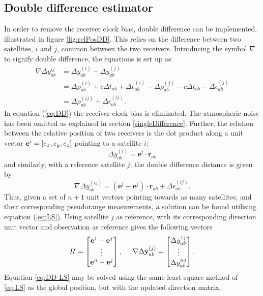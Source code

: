 \subsection{Double difference estimator}\label{ch:DD_estimator}
In order to remove the receiver clock bias, double difference can be implemented, illustrated in figure \ref{fig:relPosDD}. This relies on the difference between two satellites, $i$ and $j$, common between the two receivers. Introducing the symbol $\nabla$ to signify double difference, the equations is set up as
\begin{align}
\nabla \Delta y^{ij}_{ab}	&=\Delta y^{(i)} _{ab}-\Delta y^{(j)} _{ab} \nonumber \\
					&=\Delta \rho^{(i)}_{ab}+c\Delta t_{ab}+\Delta \epsilon^{(i)}_{ab}-\Delta \rho^{(j)}_{ab}-c\Delta t_{ab} -\Delta\epsilon^{(j)}_{ab} \nonumber\\
					&=\Delta \rho^{(ij)}_{ab}+\Delta\epsilon^{(ij)}_{ab}.\label{eq:DD}
\end{align}
In equation (\ref{eq:DD}) the receiver clock bias is eliminated. The atmospheric noise has been omitted as explained in section \ref{singleDifference}. Further, the relation between the relative position of two receivers is the dot product along a unit vector ${\bf e}^i=[e_x, e_y, e_z]$ pointing to a satellite $i$:
$$\Delta y^{(i)}_{ab}=\textbf{e}^i\cdot \textbf{r}_{ab}$$
and similarly, with a reference satellite $j$, the double difference distance is given by
$$\nabla \Delta y^{(ij)}_{ab}=(\textbf{e}^i-\textbf{e}^j)\cdot \textbf{r}_{ab}+\Delta\epsilon^{(ij)}_{ab}.$$
Thus, given a set of $n+1$ unit vectors pointing towards as many satellites, and their corresponding pseudorange measurements, a solution can be found utilising equation (\ref{eq:LS}). Using satellite $j$ as reference, with its corresponding direction unit vector and observation as reference gives the following vectors
\begin{equation}\label{eq:DD-LS}
H=\begin{bmatrix} \textbf{e}^1-\textbf{e}^j\\ \vdots\\ \textbf{e}^{n}-\textbf{e}^j\end{bmatrix}, \hspace{0.5 cm}
\nabla \Delta \textbf{y}^{(j)}_{ab}=\begin{bmatrix}\Delta y^{1j}_{ab} \\ \vdots \\ \Delta y^{nj}_{ab} \end{bmatrix}.
\end{equation}
Equation \ref{eq:DD-LS} may be solved using the same least square method of \ref{eq:LS} as the global position, but with the updated direction matrix. 

